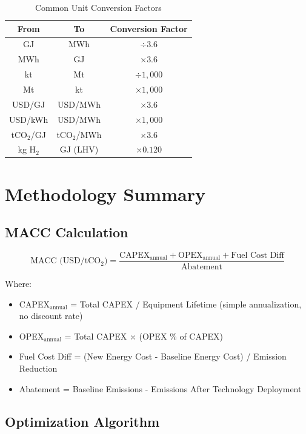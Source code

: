 \documentclass[11pt,a4paper]{report}
\newcommand{\tco}{tCO$_2$}
\begin{document}
\begin{table}[H]
\centering
\caption{Common Unit Conversion Factors}
\begin{tabular}{ccc}
\toprule
\textbf{From} & \textbf{To} & \textbf{Conversion Factor} \\
\midrule
GJ & MWh & $\div 3.6$ \\
MWh & GJ & $\times 3.6$ \\
kt & Mt & $\div 1,000$ \\
Mt & kt & $\times 1,000$ \\
USD/GJ & USD/MWh & $\times 3.6$ \\
USD/kWh & USD/MWh & $\times 1,000$ \\
\tco/GJ & \tco/MWh & $\times 3.6$ \\
kg H$_2$ & GJ (LHV) & $\times 0.120$ \\
\bottomrule
\end{tabular}
\end{table}

\chapter{Methodology Summary}

\section{MACC Calculation}

\begin{equation}
\text{MACC (USD/\tco)} = \frac{\text{CAPEX}_{\text{annual}} + \text{OPEX}_{\text{annual}} + \text{Fuel Cost Diff}}{\text{Abatement}}
\end{equation}

Where:
\begin{itemize}[leftmargin=*]
    \item CAPEX$_{\text{annual}}$ = Total CAPEX / Equipment Lifetime (simple annualization, no discount rate)
    \item OPEX$_{\text{annual}}$ = Total CAPEX $\times$ (OPEX \% of CAPEX)
    \item Fuel Cost Diff = (New Energy Cost - Baseline Energy Cost) / Emission Reduction
    \item Abatement = Baseline Emissions - Emissions After Technology Deployment
\end{itemize}

\section{Optimization Algorithm}
\end{document}
